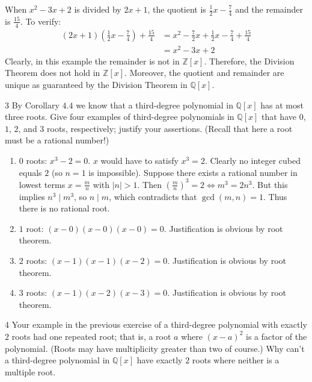 When $x^2 - 3x + 2$ is divided by $2x + 1$,
the quotient is $\frac{1}{2}x - \frac{7}{4}$ and the remainder is $\frac{15}{4}$.
To verify:
\begin{align*}
(2x + 1)\left(\frac{1}{2}x - \frac{7}{4}\right) + \frac{15}{4} 
&= x^2 - \frac{7}{2}x + \frac{1}{2}x - \frac{7}{4} + \frac{15}{4} \\
&= x^2 - 3x + 2
\end{align*}
Clearly, in this example the remainder is not in $\mathbb{Z}[x]$.
Therefore, the Division Theorem does not hold in $\mathbb{Z}[x]$.
Moreover, the quotient and remainder are unique as guaranteed by the Division Theorem in $\mathbb{Q}[x]$.

\begin{problem}{3}
    By Corollary $4.4$ we know that a third-degree polynomial in $\mathbb{Q}[x]$
    has at most three roots. Give four examples of third-degree polynomials in 
    $\mathbb{Q}[x]$ that have $0$, $1$, $2$, and $3$ roots, respectively; justify
    your assertions. (Recall that here a root must be a rational number!)
\end{problem}
\solved

\begin{enumerate}
     \item $0$ roots: $x^3 - 2 = 0$. $x$ would have to satisfy $x^3 = 2$.
           Clearly no integer cubed equals $2$ (so $n=1$ is impossible).
           Suppose there exists a rational number in lowest terms $x = \frac{m}{n}$ with $|n| > 1$.
           Then $(\frac{m}{n})^3 = 2 \iff m^3 = 2 n^3$.
           But this implies $n^3 \mid m^3$, so $n \mid m$, which contradicts that
           $\gcd(m,n)=1$. Thus there is no rational root.
     \item $1$ root:  $(x - 0)(x - 0)(x - 0) = 0$. Justification is obvious by root theorem.
     \item $2$ roots: $(x - 1)(x - 1)(x - 2) = 0$. Justification is obvious by root theorem.
     \item $3$ roots: $(x - 1)(x - 2)(x - 3) = 0$. Justification is obvious by root theorem.
\end{enumerate}

\begin{problem}{4}
    Your example in the previous exercise of a third-degree polynomial with 
    exactly $2$ roots had one repeated root; that is, a root $a$ where $(x - a)^2$
    is a factor of the polynomial. (Roots may have multiplicity greater than two 
    of course.) Why can't a third-degree polynomial in $\mathbb{Q}[x]$ have 
    exactly $2$ roots where neither is a multiple root.
\end{problem}
\solved

